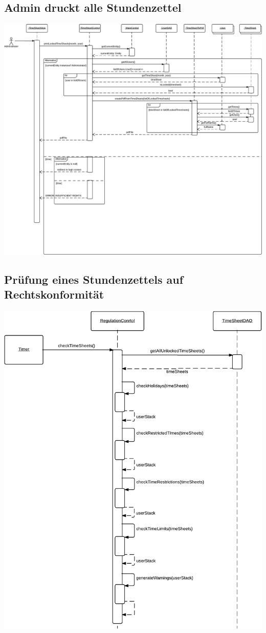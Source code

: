     \newpage
    \subsection{Admin druckt alle Stundenzettel}

        \includegraphics[width=\linewidth]{Diagramms/sequenzes/admin_prints_timesheets.pdf}

    \newpage
    \subsection{Prüfung eines Stundenzettels auf Rechtskonformität}
        \includegraphics[width=\linewidth]{Diagramms/sequenzes/check_inconsistencies.pdf}


\newpage
